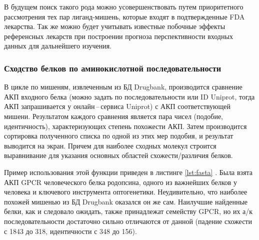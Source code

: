 \documentclass[a4paper,14pt]{article}         %
\begin{document}
В будущем поиск такого рода можно усовершенствовать путем приоритетного рассмотрения тех пар лиганд-мишень, которые входят в подтвержденные FDA лекарства. Так же можно будет учитывать известные побочные эффекты референсных лекарств при построении прогноза перспективности входных данных для дальнейшего изучения.

\subsubsection{Сходство белков по аминокислотной последовательности}

В цикле по мишеням, извлеченным из БД Drugbank, производится сравнение АКП входного белка (можно задать по последовательности или ID Uniprot, тогда АКП запрашивается у онлайн\,--\,сервиса Uniprot) с АКП соответствующей мишени. Результатом каждого сравнения является пара чисел (подобие, идентичность), характеризующих степень похожести АКП. Затем производится сортировка полученного списка по одной из этих мер подобия, и результат выводится на экран. Причем для наиболее сходных молекул строится выравнивание для указания основных областей схожести/различия белков.

Пример использования этой функции приведен в листинге \ref{lst:fasta}
\color{black}. Была взята АКП GPCR человеческого белка родопсина, одного из важнейших белков у человека и ключевого инструмента оптогенетики. Неудивительно, что наиболее похожей мишенью из БД Drugbank оказался он же сам. Наилучшие найденные белки, как и следовало ожидать, также принадлежат семейству GPCR, но их а/к последовательности достаточно сильно отличаются от данной (падение схожести с 1843 до 318, идентичности с 348 до 156). 
\end{document}
